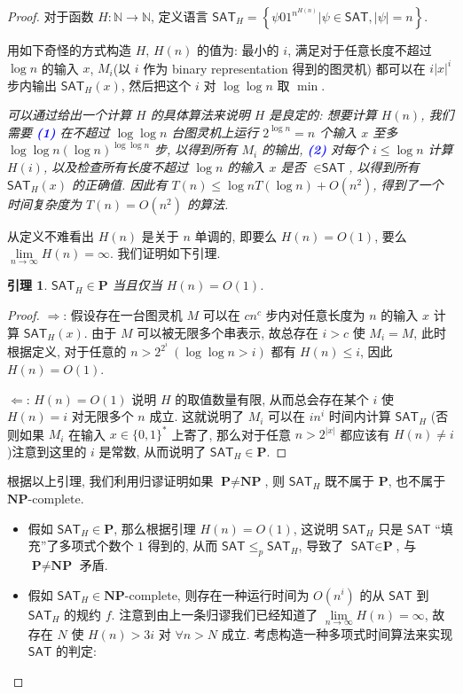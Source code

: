 \documentclass[8pt]{article}
\theoremstyle{compact}
\newtheorem{lemma}[theorem]{引理}
\def\num#1{\textnormal{\textbf{\mbox{\textcolor{blue}{(#1)}}}}}
\def\le{\leqslant}
\def\P{\textbf{P}}
\def\NP{\textbf{NP}}
\begin{document}
\begin{proof}
	对于函数 $H: \mathbb N \to \mathbb N$, 定义语言 $\textsf{SAT}_H = \left\{ \psi01^{n^{H(n)}} | \psi \in \textsf{SAT}, |\psi| = n \right\}$.

	用如下奇怪的方式构造 $H$, $H(n)$ 的值为: 最小的 $i$, 满足对于任意长度不超过 $\log n$ 的输入 $x$, $M_i$(以 $i$ 作为 binary representation 得到的图灵机) 都可以在 $i|x|^i$ 步内输出 $\textsf{SAT}_H(x)$, 然后把这个 $i$ 对 $\log \log n$ 取 $\min$.

	\textit{
		可以通过给出一个计算 $H$ 的具体算法来说明 $H$ 是良定的: 想要计算 $H(n)$, 我们需要 \num{1} 在不超过 $\log \log n$ 台图灵机上运行 $2^{\log n} = n$ 个输入 $x$ 至多 $\log \log n (\log n)^{\log \log n}$ 步, 以得到所有 $M_i$ 的输出, \num{2} 对每个 $i \le \log n$ 计算 $H(i)$, 以及检查所有长度不超过 $\log n$ 的输入 $x$ 是否 $\in \textsf{SAT}$, 以得到所有 $\textsf{SAT}_H(x)$ 的正确值. 因此有 $T(n) \le \log n T(\log n) + O(n^2)$, 得到了一个时间复杂度为 $T(n) = O(n^2)$ 的算法.
	}

	从定义不难看出 $H(n)$ 是关于 $n$ 单调的, 即要么 $H(n) = O(1)$, 要么 $\lim\limits_{n \to \infty} H(n) = \infty$. 我们证明如下引理.
	\begin{lemma}
		$\textsf{SAT}_H \in \P$ 当且仅当 $H(n) = O(1)$.
	\end{lemma}
	\begin{proof}
		$\Rightarrow$: 假设存在一台图灵机 $M$ 可以在 $cn^c$ 步内对任意长度为 $n$ 的输入 $x$ 计算 $\textsf{SAT}_H(x)$. 由于 $M$ 可以被无限多个串表示, 故总存在 $i > c$ 使 $M_i = M$, 此时根据定义, 对于任意的 $n > 2^{2^i} \ (\log \log n > i)$ 都有 $H(n) \le i$, 因此 $H(n) = O(1)$.

		$\Leftarrow$: $H(n) = O(1)$ 说明 $H$ 的取值数量有限, 从而总会存在某个 $i$ 使 $H(n) = i$ 对无限多个 $n$ 成立. 这就说明了 $M_i$ 可以在 $in^i$ 时间内计算 $\textsf{SAT}_H$ (否则如果 $M_i$ 在输入 $x \in \{0, 1\}^*$ 上寄了, 那么对于任意 $n > 2^{|x|}$ 都应该有 $H(n) \neq i$)注意到这里的 $i$ 是常数, 从而说明了 $\textsf{SAT}_H \in \P$.
	\end{proof}

	根据以上引理, 我们利用归谬证明如果 $\P \neq \NP$, 则 $\textsf{SAT}_H$ 既不属于 $\P$, 也不属于 $\NP$-complete.

	\begin{itemize}
		\item 假如 $\textsf{SAT}_H \in \P$, 那么根据引理 $H(n) = O(1)$, 这说明 $\textsf{SAT}_H$ 只是 $\textsf{SAT}$ “填充”了多项式个数个 $1$ 得到的, 从而 $\textsf{SAT} \le_p \textsf{SAT}_H$, 导致了 $\textsf{SAT} \in \P$, 与 $\P \neq \NP$ 矛盾.
		\item 假如 $\textsf{SAT}_H \in \NP$-complete, 则存在一种运行时间为 $O(n^i)$ 的从 $\textsf{SAT}$ 到 $\textsf{SAT}_H$ 的规约 $f$. 注意到由上一条归谬我们已经知道了 $\lim\limits_{n \to \infty}H(n) = \infty$, 故存在 $N$ 使 $H(n) > 3i$ 对 $\forall n > N$ 成立. 考虑构造一种多项式时间算法来实现 $\textsf{SAT}$ 的判定: 
		

\end{itemize}
\end{proof}
\end{document}

